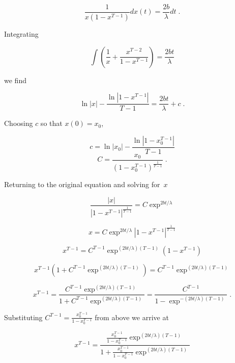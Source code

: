 $$\frac{1}{x(1-x^{T-1})}dx(t)=\frac{2b}{\lambda}dt\;.$$




Integrating

$$\int(\frac{1}{x} + \frac{x^{T-2}}{1-x^{T-1}})=\frac{2bt}{\lambda}$$




we find

$$\ln|x|-\frac{\ln|1-x^{T-1}|}{T-1}=\frac{2bt}{\lambda}+c\;.$$

Choosing $c$ so that $x(0)=x_0$,

$$c=\ln|x_0|-\frac{\ln|1-x_0^{T-1}|}{T-1}$$
$$C=\frac{x_0}{(1-x_0^{T-1})^\frac{1}{T-1}}\;.$$

Returning to the original equation and solving for~$x$

$$\frac{|x|}{|1-x^{T-1}|^\frac{1}{T-1}}=C\exp^{2bt/\lambda}$$

$$x=C\exp^{2bt/\lambda}|1-x^{T-1}|^\frac{1}{T-1}$$

$$x^{T-1}=C^{T-1}\exp^{(2bt/\lambda)(T-1)}(1-x^{T-1})$$

$$x^{T-1}(1+C^{T-1}\exp^{(2bt/\lambda)(T-1)})=C^{T-1}\exp^{(2bt/\lambda)(T-1)}$$

$$x^{T-1}=\frac{C^{T-1}\exp^{(2bt/\lambda)(T-1)}}{1+C^{T-1}\exp^{(2bt/\lambda)(T-1)}}=\frac{C^{T-1}}{1-\exp^{-(2bt/\lambda)(T-1)}}\;.$$

Substituting $C^{T-1}=\frac{x_0^{T-1}}{1-x_0^{T-1}}$ from above we arrive at

$$x^{T-1}=\frac{\frac{x_0^{T-1}}{1-x_0^{T-1}}\exp^{(2bt/\lambda)(T-1)}}{1+\frac{x_0^{T-1}}{1-x_0^{T-1}}\exp^{(2bt/\lambda)(T-1)}}$$

